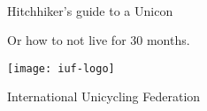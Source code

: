 




\begin{titlepage}
\centering
\ \\
\vspace{5cm}
{\Huge Hitchhiker's guide to a Unicon}

Or how to not live for 30 months.
\vspace{5mm}

\texttt{[image: iuf-logo]}

\vspace{5mm}
{\huge International Unicycling Federation}

\vspace{5mm}

\vspace{55mm}

\vspace{5mm}

\end{titlepage}

\doparttoc
\tableofcontents

\mainmatter

\backmatter

